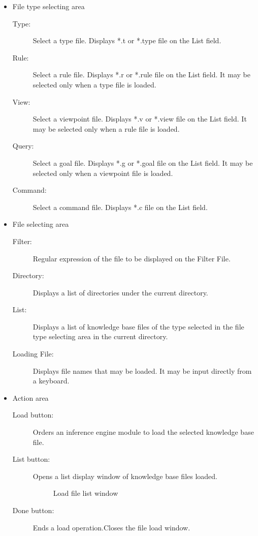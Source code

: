 \begin{itemize}

\item File type selecting area
\begin{description}
\item[Type:] Select a type file.
Displays *.t or *.type file on the List field.
\item[Rule:] Select a rule file.
Displays *.r or *.rule file on the List field.
It may be selected only when a type file is loaded.
\item[View:] Select a viewpoint file.
Displays *.v or *.view file on the List field.
It may be selected only when a rule file is loaded.
\item[Query:] Select a goal file.
Displays *.g or *.goal file on the List field.
It may be selected only when a viewpoint file is loaded.
\item[Command:] Select a command file.
Displays *.c file on the List field.
\end{description}

\item File selecting area
\begin{description}

\item[Filter:] Regular expression of the file to be displayed on the Filter File. 
\item[Directory:] Displays a list of directories under the current directory.
\item[List:] Displays a list of knowledge base files of the type selected in the file type selecting area in the current directory.
\item[Loading File:] Displays file names that may be loaded.
It may be input directly from a keyboard.

\end{description}

\item Action area
\begin{description}
\item[Load button:] Orders an inference engine module to load the selected knowledge base file.
\item[List button:] Opens a list display window of knowledge base files loaded.

\begin{figure}[htb]
\begin{center}
\end{center}
\caption{Load file list window}\label{Load file list window}
\end{figure}

\item[Done button:] Ends a load operation.Closes the file load window.

\end{description}

\end{itemize}

